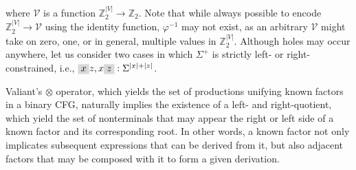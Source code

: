 \documentclass[sigplan,nonacm,anonymous]{acmart}\settopmatter{printfolios=false,printccs=false,printacmref=false}
\begin{document}
  \noindent where $\mathcal{V}$ is a function $\mathbb{Z}_2^{|V|}\rightarrow\mathbb{Z}_2$. Note that while always possible to encode $\mathbb{Z}_2^{|V|} \rightarrow \mathcal{V}$ using the identity function, $\varphi^{-1}$ may not exist, as an arbitrary $\mathcal{V}$ might take on zero, one, or in general, multiple values in $\mathbb{Z}_2^{|V|}$. Although holes may occur anywhere, let us consider two cases in which $\Sigma^+$ is strictly left- or right-constrained, i.e., $\highlight{x}z, x\highlight{z}: \Sigma^{|x|+|z|}$.

  Valiant's $\otimes$ operator, which yields the set of productions unifying known factors in a binary CFG, naturally implies the existence of a left- and right-quotient, which yield the set of nonterminals that may appear the right or left side of a known factor and its corresponding root. In other words, a known factor not only implicates subsequent expressions that can be derived from it, but also adjacent factors that may be composed with it to form a given derivation.
\end{document}
